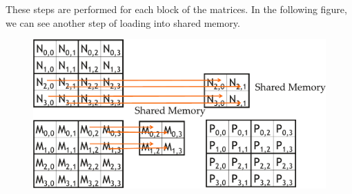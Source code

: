 \begin{enumerate}
    These steps are performed for each block of the matrices. In the following figure, we can see another step of loading into shared memory.
    \begin{figure}[!htp]
        \centering
        \includegraphics[width=.8\textwidth]{img/cuda-tiled-matrix-multiplication-4.pdf}
    \end{figure}



\end{enumerate}
